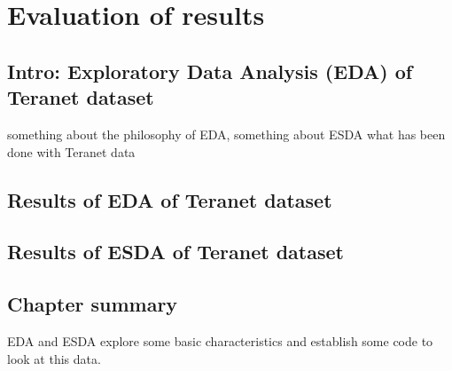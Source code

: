 \chapter{Evaluation of results} \label{ch:evaluation}

\section{Intro: Exploratory Data Analysis (EDA) of Teranet dataset} \label{sec:eda}

something about the philosophy of EDA,
something about ESDA
what has been done with Teranet data

\section{Results of EDA of Teranet dataset} \label{sec:eda_results_teranet}


\section{Results of ESDA of Teranet dataset} \label{sec:esda_results_teranet}


\section{Chapter summary} \label{sec:eda_summary}
EDA and ESDA explore some basic characteristics and establish some code to look at this data.
